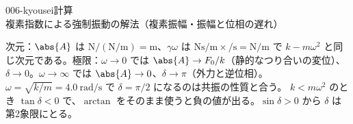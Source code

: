 \documentclass[uplatex,dvipdfmx,a4paper,11pt]{jsarticle}
\begin{document}
\begin{mondai}{006-kyousei}{計算}{複素指数による強制振動の解法（複素振幅・振幅と位相の遅れ）}
\begin{tadashii}
\begin{ronten}
\end{ronten}
\kenzan 次元：$\abs{A}$ は $\unit{\newton}/(\unit{\newton\per\metre})=\unit{\metre}$、$\gamma\omega$ は $\unit{\newton\second\per\metre}\times\unit{\per\second}=\unit{\newton\per\metre}$ で $k-m\omega^{2}$ と同じ次元である。極限：$\omega\to0$ では $\abs{A}\to F_{0}/k$（静的なつり合いの変位）、$\delta\to0$。$\omega\to\infty$ では $\abs{A}\to0$、$\delta\to\pi$（外力と逆位相）。$\omega=\sqrt{k/m}=\qty{4.0}{\radian\per\second}$ で $\delta=\pi/2$ になるのは共振の性質と合う。
\tsumazuki $k<m\omega^{2}$ のとき $\tan\delta<0$ で、$\arctan$ をそのまま使うと負の値が出る。$\sin\delta>0$ から $\delta$ は第2象限にとる。
\end{tadashii}
\end{mondai}

\noteowari
\end{document}
